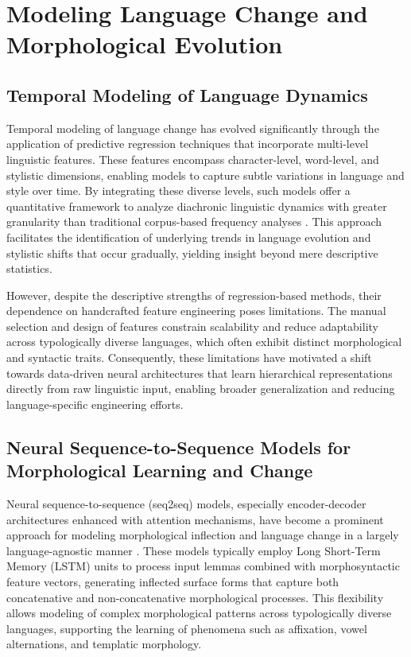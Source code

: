 \section{Modeling Language Change and Morphological Evolution}

\subsection{Temporal Modeling of Language Dynamics}

Temporal modeling of language change has evolved significantly through the application of predictive regression techniques that incorporate multi-level linguistic features. These features encompass character-level, word-level, and stylistic dimensions, enabling models to capture subtle variations in language and style over time. By integrating these diverse levels, such models offer a quantitative framework to analyze diachronic linguistic dynamics with greater granularity than traditional corpus-based frequency analyses \cite{ref41}. This approach facilitates the identification of underlying trends in language evolution and stylistic shifts that occur gradually, yielding insight beyond mere descriptive statistics.

However, despite the descriptive strengths of regression-based methods, their dependence on handcrafted feature engineering poses limitations. The manual selection and design of features constrain scalability and reduce adaptability across typologically diverse languages, which often exhibit distinct morphological and syntactic traits. Consequently, these limitations have motivated a shift towards data-driven neural architectures that learn hierarchical representations directly from raw linguistic input, enabling broader generalization and reducing language-specific engineering efforts.

\subsection{Neural Sequence-to-Sequence Models for Morphological Learning and Change}

Neural sequence-to-sequence (seq2seq) models, especially encoder-decoder architectures enhanced with attention mechanisms, have become a prominent approach for modeling morphological inflection and language change in a largely language-agnostic manner \cite{ref42}. These models typically employ Long Short-Term Memory (LSTM) units to process input lemmas combined with morphosyntactic feature vectors, generating inflected surface forms that capture both concatenative and non-concatenative morphological processes. This flexibility allows modeling of complex morphological patterns across typologically diverse languages, supporting the learning of phenomena such as affixation, vowel alternations, and templatic morphology.

